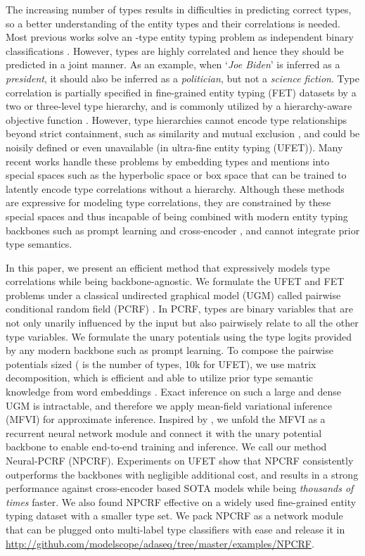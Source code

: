 \documentclass[11pt]{article}
\newcommand{\code}{\url{http://github.com/modelscope/adaseq/tree/master/examples/NPCRF}}
\begin{document}
The increasing number of types results in difficulties in predicting correct types, so a better understanding of the entity types and their correlations is needed. Most previous works solve an -type entity typing problem as  independent binary classifications \cite{figer,ontonotes,ufet,onoe-durrett-2019-learning,ding2021prompt,dfet,lite}. However, types are highly correlated and hence they should be predicted in a joint manner. As an example, when `{\em Joe Biden}' is inferred as a {\it president}, it should also be inferred as a {\it politician}, but not a {\it science fiction}. Type correlation is partially specified in fine-grained entity typing (FET) datasets by a two or three-level type hierarchy, and is commonly utilized by a hierarchy-aware objective function \cite{ren2016label, jin-etal-2019-fine, xu-barbosa-2018-neural}. However, type hierarchies cannot encode type relationships beyond strict containment, such as similarity and mutual exclusion \cite{onoe-etal-2021-modeling}, and could be noisily defined \cite{wu2019modeling} or even unavailable (in ultra-fine entity typing (UFET)). Many recent works handle these problems by embedding types and mentions into special spaces such as the hyperbolic space \cite{lopez-strube-2020-fully} or box space \cite{onoe-etal-2021-modeling} that can be trained to latently encode type correlations without a hierarchy. Although these methods are expressive for modeling type correlations, they are constrained by these special spaces and thus incapable of being combined with modern entity typing backbones such as prompt learning \cite{ding2021prompt} and cross-encoder \cite{lite}, and cannot integrate prior type semantics.

In this paper, we present an efficient method that expressively models type correlations while being backbone-agnostic. We formulate the UFET and FET problems under a classical undirected graphical model (UGM) \cite{pgm} called pairwise conditional random field (PCRF) \cite{pcrf2005}. In PCRF, types are binary variables that are not only unarily influenced by the input but also pairwisely relate to all the other type variables. We formulate the unary potentials using the type logits provided by any modern backbone such as prompt learning. To compose the pairwise potentials sized  ( is the number of types, 10k for UFET), we use matrix decomposition, which is efficient and able to utilize prior type semantic knowledge from word embeddings \cite{glove}. Exact inference on such a large and dense UGM is intractable, and therefore we apply mean-field variational inference (MFVI) for approximate inference. Inspired by \citet{crfrnn}, we unfold the MFVI as a recurrent neural network module and connect it with the unary potential backbone to enable end-to-end training and inference. We call our method Neural-PCRF (NPCRF). Experiments on UFET show that NPCRF consistently outperforms the backbones with negligible additional cost, and results in a strong performance against cross-encoder based SOTA models while being \emph{thousands of times} faster. We also found NPCRF effective on a widely used fine-grained entity typing dataset with a smaller type set. We pack NPCRF as a network module that can be plugged onto multi-label type classifiers with ease and release it in \code.
\end{document}
